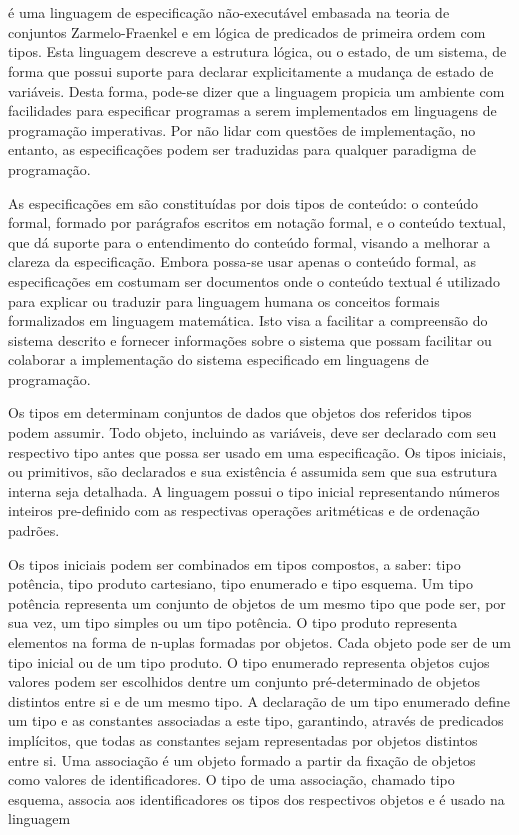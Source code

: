 \section{\Z}\label{chap:revisaobib:z}
\Z \cite{ZMoura,ZNotation} é uma linguagem de especificação não-executável embasada na teoria de conjuntos Zarmelo-Fraenkel e em lógica de predicados de primeira ordem com tipos.
Esta linguagem descreve a estrutura lógica, ou o estado, de um sistema, de forma que possui suporte para declarar explicitamente a mudança de estado de variáveis.
Desta forma, pode-se dizer que a linguagem propicia um ambiente com facilidades para especificar programas a serem implementados em linguagens de programação imperativas.
Por não lidar com questões de implementação, no entanto, as especificações podem ser traduzidas para qualquer paradigma de programação.

As especificações em \Z são constituídas por dois tipos de conteúdo: o conteúdo formal, formado por parágrafos escritos em notação formal, e o conteúdo textual, que dá suporte para o entendimento do conteúdo formal, visando a melhorar a clareza da especificação.
Embora possa-se usar apenas o conteúdo formal, as especificações em \Z costumam ser documentos onde o conteúdo textual é utilizado para explicar ou traduzir para linguagem humana os conceitos formais formalizados em linguagem matemática.
Isto visa a facilitar a compreensão do sistema descrito e fornecer informações sobre o sistema que possam facilitar ou colaborar a implementação do sistema especificado em linguagens de programação.

Os tipos em \Z determinam conjuntos de dados que objetos dos referidos tipos podem assumir.
Todo objeto, incluindo as variáveis, deve ser declarado com seu respectivo tipo antes que possa ser usado em uma especificação.
Os tipos iniciais, ou primitivos, são declarados e sua existência é assumida sem que sua estrutura interna seja detalhada.
A linguagem possui o tipo inicial representando números inteiros pre-definido com as respectivas operações aritméticas e de ordenação padrões.

Os tipos iniciais podem ser combinados em tipos compostos, a saber: tipo potência, tipo produto cartesiano, tipo enumerado e tipo esquema.
Um tipo potência representa um conjunto de objetos de um mesmo tipo que pode ser, por sua vez, um tipo simples ou um tipo potência.
O tipo produto representa elementos na forma de n-uplas formadas por objetos.
Cada objeto pode ser de um tipo inicial ou de um tipo produto.
O tipo enumerado representa objetos cujos valores podem ser escolhidos dentre um conjunto pré-determinado de objetos distintos entre si e de um mesmo tipo.
A declaração de um tipo enumerado define um tipo e as constantes associadas a este tipo, garantindo, através de predicados implícitos, que todas as constantes sejam representadas por objetos distintos entre si.
Uma associação é um objeto formado a partir da fixação de objetos como valores de identificadores.
O tipo de uma associação, chamado tipo esquema, associa aos identificadores os tipos dos respectivos objetos e é usado na linguagem 

